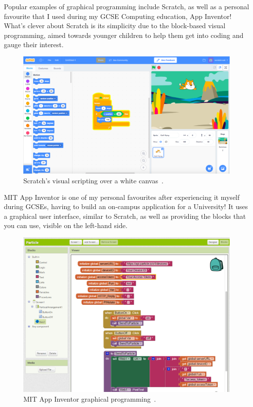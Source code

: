 \documentclass[a4paper, 12pt]{article}
\begin{document}
    Popular examples of graphical programming include Scratch, as well as a personal favourite that 
    I used during my GCSE Computing education, App Inventor! What's clever about Scratch is its 
    simplicity due to the block-based visual programming, aimed  towards younger children to
    help them get into coding and gauge their interest.

    \begin{figure}[h]
        \centering
        \includegraphics[width=160mm]{scratch_image}
        \caption{Scratch's visual scripting over a white canvas~\cite{thescratchteam}.}
    \end{figure}

    \clearpage
    MIT App Inventor is one of my personal favourites after experiencing it myself during GCSEs, 
    having to build an on-campus application for a University! It uses a graphical user 
    interface, similar to Scratch, as well as providing the blocks that you can use, visible on 
    the left-hand side.

    \begin{figure}[h]
        \centering
        \includegraphics[width=150mm]{app_inventor}
        \caption{MIT App Inventor graphical programming~\cite{adafruit}.}
    \end{figure}
\end{document}
